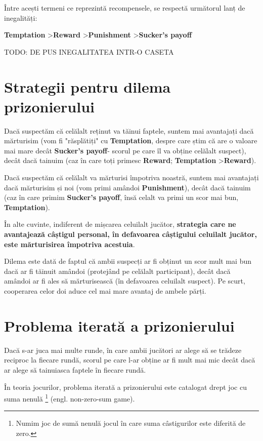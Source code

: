 Între acești termeni ce reprezintă recompensele, se respectă următorul lanț de inegalități: 

\begin{center} 
	\textbf{Temptation} \textgreater \textbf{Reward} \textgreater \textbf{Punishment} \textgreater \textbf{Sucker's payoff} 
\end{center} 

TODO: DE PUS INEGALITATEA INTR-O CASETA\\

\section{Strategii pentru dilema prizonierului}

Dacă suspectăm că celălalt reținut va tăinui faptele, suntem mai avantajați dacă mărturisim (vom fi "răsplătiți" cu \textbf{Temptation}, despre care știm că are o valoare mai mare decât \textbf{Sucker's payoff}- scorul pe care îl va obține celălalt suspect), decât dacă tainuim (caz în care toți primesc \textbf{Reward}; \textbf{Temptation} \textgreater \textbf{Reward}).

Dacă suspectăm că celălalt va mărturisi împotriva noastră, suntem mai avantajați dacă mărturisim și noi (vom primi amândoi \textbf{Punishment}), decât dacă tainuim (caz în care primim \textbf{Sucker's payoff}, însă celalt va primi un scor mai bun, \textbf{Temptation}).

În alte cuvinte, indiferent de mișcarea celuilalt jucător, \textbf{strategia care ne avantajează câștigul personal, în defavoarea câștigului celuilalt jucător, este mărturisirea împotriva acestuia}.

Dilema este dată de faptul că ambii suspecți ar fi obținut un scor mult mai bun dacă ar fi tăinuit amândoi (protejând pe celălalt participant), decât dacă amândoi ar fi ales să mărturisească (în defavoarea celuilalt suspect). Pe scurt, cooperarea celor doi aduce cel mai mare avantaj de ambele părți.

\section {Problema iterată a prizonierului} 

Dacă s-ar juca mai multe runde, în care ambii jucători ar alege să se trădeze reciproc la fiecare rundă, scorul pe care l-ar obține ar fi mult mai mic decât dacă ar alege să tainuiasca faptele în fiecare rundă. 

În teoria jocurilor, problema iterată a prizonierului este catalogat drept joc cu suma nenulă \footnote{Numim joc de sumă nenulă jocul în care suma câstigurilor este diferită de zero.} (engl. non-zero-sum game).

